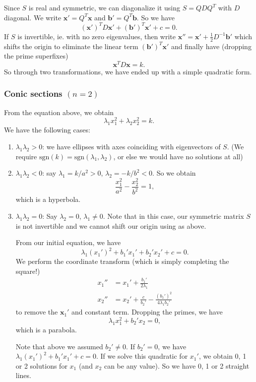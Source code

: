 \documentclass[a4paper]{article}
\begin{document}
Since $S$ is real and symmetric, we can diagonalize it using $S = QDQ^T$ with $D$ diagonal. We write $\mathbf{x}' = Q^T \mathbf{x}$ and $\mathbf{b}' = Q^T \mathbf{b}$. So we have
\[
  (\mathbf{x}')^TD\mathbf{x}' + (\mathbf{b}')^T \mathbf{x}' + c = 0.
\]
If $S$ is invertible, ie. with no zero eigenvalues, then write $\mathbf{x}'' = \mathbf{x}' + \frac{1}{2}D^{-1}\mathbf{b}'$ which shifts the origin to eliminate the linear term $(\mathbf{b}')^T\mathbf{x}'$ and finally have (dropping the prime superfixes)
\[
  \mathbf{x}^TD\mathbf{x} = k.
\]
So through two transformations, we have ended up with a simple quadratic form.

\subsubsection{Conic sections \texorpdfstring{$(n = 2)$}{(n = 2)}}
From the equation above, we obtain
\[
  \lambda_1x_1^2 + \lambda_2x_2^2 = k.
\]
We have the following cases:
\begin{enumerate}
  \item $\lambda_1\lambda_2 > 0$: we have ellipses with axes coinciding with eigenvectors of $S$. (We require $\mathrm{sgn}(k) = \mathrm{sgn}(\lambda_1,\lambda_2)$, or else we would have no solutions at all)
  \item $\lambda_1\lambda_2 < 0$: say $\lambda_1 = k/a^2 > 0$, $\lambda_2 = -k/b^2 < 0$. So we obtain
    \[
      \frac{x_1^2}{a^2} - \frac{x_2^2}{b^2} = 1,
    \]
    which is a hyperbola.
  \item $\lambda_1\lambda_2 = 0$: Say $\lambda_2 = 0$, $\lambda_1\not= 0$. Note that in this case, our symmetric matrix $S$ is not invertible and we cannot shift our origin using as above.

    From our initial equation, we have
    \[
      \lambda_1(x_1')^2 + b_1'x_1' + b_2' x_2' + c = 0.
    \]
    We perform the coordinate transform (which is simply completing the square!)
    \begin{align*}
      x_1'' &= x_1' + \frac{b_1'}{2\lambda_1}\\
      x_2'' &= x_2' + \frac{c}{b_2'} - \frac{(b_1')^2}{4\lambda_1b_2'}
    \end{align*}
    to remove the $\mathbf{x}_1'$ and constant term. Dropping the primes, we have
    \[
      \lambda_1 x_1^2 + b_2' x_2 = 0,
    \]
    which is a parabola.

    Note that above we assumed $b_2'\not= 0$. If $b_2' = 0$, we have $\lambda_1(x_1')^2 + b_1' x_1' + c = 0$. If we solve this quadratic for $x_1'$, we obtain 0, 1 or 2 solutions for $x_1$ (and $x_2$ can be any value). So we have 0, 1 or 2 straight lines.
\end{enumerate}
\end{document}
